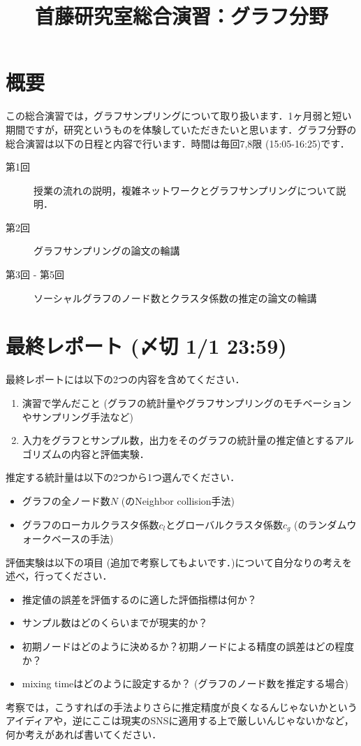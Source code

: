 \documentclass{ujarticle}
\title{首藤研究室総合演習：グラフ分野}
\author{}
\begin{document}
\date{}
\maketitle

\section{概要}
この総合演習では，グラフサンプリングについて取り扱います．1ヶ月弱と短い期間ですが，研究というものを体験していただきたいと思います．グラフ分野の総合演習は以下の日程と内容で行います．時間は毎回7,8限 (15:05-16:25)です．

\begin{description}
 \item[第1回] 授業の流れの説明，複雑ネットワークとグラフサンプリングについて説明．
 
 \item[第2回] グラフサンプリングの論文\cite{graphsampling}の輪講
 
  \item[第3回 - 第5回] ソーシャルグラフのノード数とクラスタ係数の推定の論文\cite{hardiman}の輪講
  
\end{description}

\section{最終レポート (〆切 1/1 23:59)}

最終レポートには以下の2つの内容を含めてください．
\begin{enumerate}
  \item 演習で学んだこと (グラフの統計量やグラフサンプリングのモチベーションやサンプリング手法など)
  \item 入力をグラフとサンプル数，出力をそのグラフの統計量の推定値とするアルゴリズムの内容と評価実験．
\end{enumerate}

推定する統計量は以下の2つから1つ選んでください．
\begin{itemize}
  \item グラフの全ノード数$N$ (\cite{hardiman}のNeighbor collision手法)
  \item グラフのローカルクラスタ係数$c_l$とグローバルクラスタ係数$c_g$ (\cite{hardiman}のランダムウォークベースの手法)
\end{itemize}

評価実験は以下の項目 (追加で考察してもよいです．)について自分なりの考えを述べ，行ってください．
\begin{itemize}
\item 推定値の誤差を評価するのに適した評価指標は何か？
  \item サンプル数はどのくらいまでが現実的か？
  \item 初期ノードはどのように決めるか？初期ノードによる精度の誤差はどの程度か？
  \item mixing timeはどのように設定するか？ (グラフのノード数を推定する場合)
\end{itemize}

考察では，こうすれば\cite{hardiman}の手法よりさらに推定精度が良くなるんじゃないかというアイディアや，逆にここは現実のSNSに適用する上で厳しいんじゃないかなど，何か考えがあれば書いてください．



\end{document}
